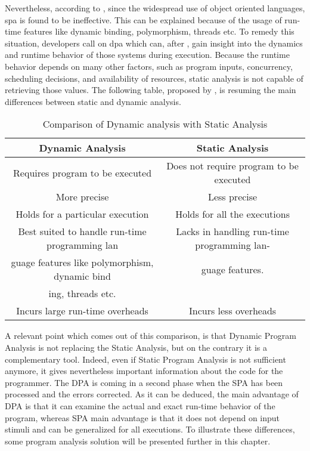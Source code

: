 Nevertheless, according to \cite{Gosain2015}, since the widespread use of object oriented languages, \gls{spa} is found to be ineffective. This can be explained because of the usage of run-time features like dynamic binding, polymorphism, threads etc. To remedy this situation, developers call on \gls{dpa} which can, after \cite{Marek2015100}, gain insight into the dynamics and runtime behavior of those systems during execution. Because the runtime behavior depends on many other factors, such as program inputs, concurrency, scheduling decisions, and availability of resources, static analysis is not capable of retrieving those values. The following table, proposed by \cite{Gosain2015}, is resuming the main differences between static and dynamic analysis.

\bigskip

\begin{table}[htb]
\begin{center}
\begin{tabulary}{\textwidth}{CC}
  \hline
  Dynamic Analysis 	& Static Analysis \\\hline
  Requires program to be executed	& Does not require program to be executed \\
  More precise & Less precise \\
  Holds for a particular execution & Holds for all the executions \\
  Best suited to handle run-time programming lan & Lacks in handling run-time programming lan-\\
guage features like polymorphism, dynamic bind & guage features.\\
ing, threads etc. &  \\
  Incurs large run-time overheads & Incurs less overheads \\\hline
\end{tabulary}
\end{center}
\caption{Comparison of Dynamic analysis with Static Analysis}
\label{list:survey}
\end{table}

\bigskip

A relevant point which comes out of this comparison, is that Dynamic Program Analysis is not replacing the Static Analysis, but on the contrary it is a complementary tool. Indeed, even if Static Program Analysis is not sufficient anymore, it gives nevertheless important information about the code for the programmer. The DPA is coming in a second phase when the SPA has been processed and the errors corrected. As it can be deduced, the main advantage of DPA is that it can examine the actual and exact run-time behavior of the program, whereas SPA main advantage is that it does not depend on input stimuli and can be generalized for all executions. To illustrate these differences, some program analysis solution will be presented further in this chapter.

